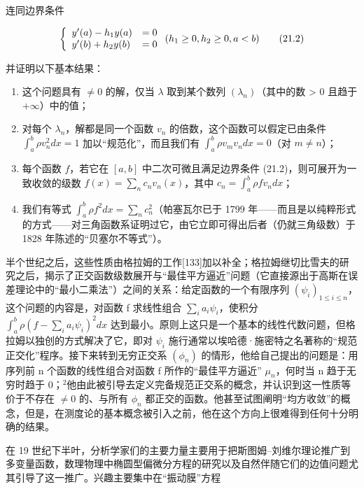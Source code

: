 连同边界条件

\[
\left\{ \begin{array}{l l} y ^ {\prime} (a) - h _ {1} y (a) & = 0 \\ y ^ {\prime} (b) + h _ {2} y (b) & = 0 \end{array} \right. (h _ {1} \geq 0, h _ {2} \geq 0, a <   b)\tag{21.2}
\]

并证明以下基本结果：

\begin{enumerate}
\def\labelenumi{\arabic{enumi})}
\item
  这个问题具有 \(\neq 0\) 的解，仅当 \(\lambda\) 取到某个数列 \((\lambda_{n})\)（其中的数 \textgreater{} 0 且趋于 \(+\infty\)）中的值；
\item
  对每个 \(\lambda_{n}\)，解都是同一个函数 \(v_{n}\) 的倍数，这个函数可以假定已由条件 \(\int_{a}^{b} \rho v_{n}^{2} dx = 1\) 加以“规范化”，而且我们有 \(\int_{a}^{b} \rho v_{m} v_{n} dx = 0\)（对 \(m \neq n\)）；
\item
  每个函数 \(f\)，若它在 \([a, b]\) 中二次可微且满足边界条件 (21.2)，则可展开为一致收敛的级数 \(f(x) = \sum_{n} c_{n} v_{n}(x)\)，其中 \(c_{n} = \int_{a}^{b} \rho f v_{n} dx\)；
\item
  我们有等式 \(\int_{a}^{b}\rho f^{2}dx=\sum_{n}c_{n}^{2}\)（帕塞瓦尔已于 1799 年——而且是以纯粹形式的方式——对三角函数系证明过它，由它立即可得出后者（仍就三角级数）于 1828 年陈述的“贝塞尔不等式”）。
\end{enumerate}

半个世纪之后，这些性质由格拉姆的工作{[}133{]}加以补全；格拉姆继切比雪夫的研究之后，揭示了正交函数级数展开与“最佳平方逼近”问题（它直接源出于高斯在误差理论中的“最小二乘法”）之间的关系：给定函数的一个有限序列 \((\psi_{i})_{1\leq i\leq n}\)，这个问题的内容是，对函数 f 求线性组合 \(\sum_{i}a_{i}\psi_{i}\)，使积分 \(\int_{a}^{b}\rho(f-\sum_{i}a_{i}\psi_{i})^{2}dx\) 达到最小。原则上这只是一个基本的线性代数问题，但格拉姆以独创的方式解决了它，即对 \(\psi_{i}\) 施行通常以埃哈德·施密特之名著称的“规范正交化”程序。接下来转到无穷正交系 \((\phi_{n})\) 的情形，他给自己提出的问题是：用序列前 n 个函数的线性组合对函数 f 所作的“最佳平方逼近” \(\mu_{n}\)，何时当 n 趋于无穷时趋于 0；\(^{2}\)他由此被引导去定义完备规范正交系的概念，并认识到这一性质等价于不存在 \(\neq0\) 的、与所有 \(\phi_{n}\) 都正交的函数。他甚至试图阐明“均方收敛”的概念，但是，在测度论的基本概念被引入之前，他在这个方向上很难得到任何十分明确的结果。

在 19 世纪下半叶，分析学家们的主要力量主要用于把斯图姆–刘维尔理论推广到多变量函数，数理物理中椭圆型偏微分方程的研究以及自然伴随它们的边值问题尤其引导了这一推广。兴趣主要集中在“振动膜”方程

